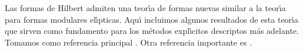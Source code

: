 % 
% 
% 
Las formas de Hilbert admiten una teor\'{\i}a de formas nuevas similar a la
teor\'{\i}a para formas modulares el\'{\i}pticas. Aqu\'{\i} incluimos algunos
resultados de esta teor\'{\i}a que sirven como fundamento para los m\'{e}todos
expl\'{\i}citos descriptos m\'{a}s adelante. Tomamos como referencia principal
\cite{ShemanskeWalling}. Otra referencia importante es
\cite{MiyakeOnAutomorphicFormsOnGL}.


